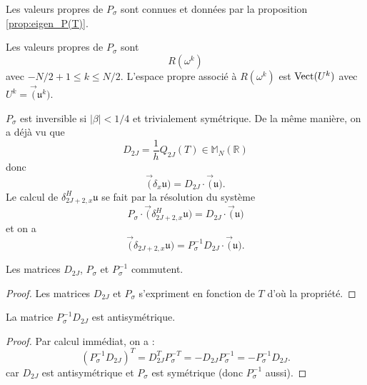 Les valeurs propres de $P_{\sigma}$ sont connues et données par la proposition \ref{prop:eigen_P(T)}.
\begin{proposition}
Les valeurs propres de $P_{\sigma}$ sont 
\begin{equation}
R(\omega^k)
\end{equation}
avec $-N/2+1 \leq k \leq N/2$. L'espace propre associé à $R(\omega^k)$ est $\text{Vect}(U^k)$ avec $U^k = \vec( \mathfrak{u}^k )$.
\end{proposition}

$P_{\sigma}$ est inversible si $|\beta |<1/4$ et trivialement symétrique. 
De la même manière, on a déjà vu que 
\begin{equation}
D_{2J} = \dfrac{1}{h} Q_{2J}(T) \in \mathbb{M}_{N}(\mathbb{R})
\end{equation}
donc 
\begin{equation}
\vec (\delta_{x} \mathfrak{u}) = D_{2J} \cdot \vec (\mathfrak{u}).
\end{equation}
Le calcul de $\delta^H_{2J+2,x} \mathfrak{u}$ se fait par la résolution du système
\begin{equation}
P_{\sigma} \cdot \vec (\delta_{2J+2,x}^H \mathfrak{u}) = D_{2J} \cdot \vec (\mathfrak{u})
\end{equation}
et on a 
\begin{equation}
\vec (\delta_{2J+2,x} \mathfrak{u} ) =P_{\sigma}^{-1} D_{2J} \cdot \vec (\mathfrak{u}).
\end{equation}

\begin{proposition}
Les matrices $D_{2J}$, $P_{\sigma}$ et $P^{-1}_{\sigma}$ commutent.
\end{proposition}

\begin{proof}
Les matrices $D_{2J}$ et $P_{\sigma}$ s'expriment en fonction de $T$ d'où la propriété.
\end{proof}

\begin{proposition}
La matrice $P^{-1}_{\sigma}D_{2J}$ est antisymétrique.
\end{proposition}

\begin{proof}
Par calcul immédiat, on a :
\begin{equation}
(P^{-1}_{\sigma}D_{2J})^T = D_{2J}^T P_{\sigma}^{-T} = - D_{2J} P_{\sigma}^{-1} = - P_{\sigma}^{-1} D_{2J}.
\end{equation}
car $D_{2J}$ est antisymétrique et $P_{\sigma}$ est symétrique (donc $P^{-1}_{\sigma}$ aussi). 
\end{proof}


